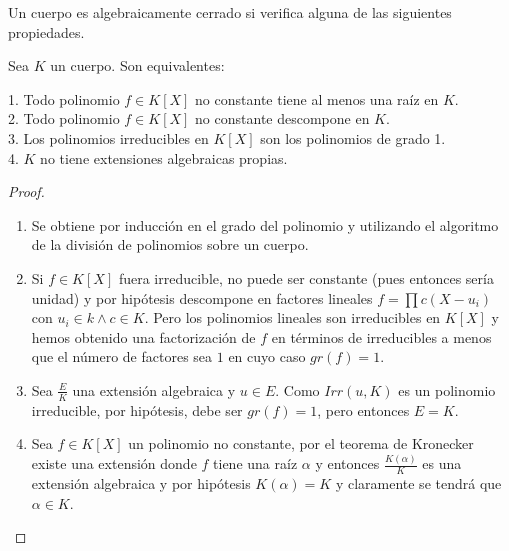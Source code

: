 \begin{definition}
Un cuerpo es algebraicamente cerrado si verifica alguna de las siguientes propiedades.
\end{definition}

\begin{proposition}
	Sea $K$ un cuerpo. Son equivalentes:
	
	1. Todo polinomio $f \in K[X]$ no constante tiene al menos una raíz en $K$.\\
	2. Todo polinomio $f \in K[X]$ no constante descompone en $K$. \\
	3. Los polinomios irreducibles en $K[X]$ son los polinomios de grado 1. \\
	4. $K$ no tiene extensiones algebraicas propias. 
\end{proposition}
\begin{proof}
\begin{enumerate}
\item Se obtiene por inducción en el grado del polinomio y utilizando el algoritmo de la división de polinomios sobre un cuerpo.
\item Si $f \in K[X]$ fuera irreducible, no puede ser constante (pues entonces sería unidad) y por hipótesis descompone en factores lineales $f = \prod c(X-u_i)$ con $u_i \in k \land c \in K$. Pero los polinomios lineales son irreducibles en $K[X]$ y hemos obtenido una factorización de $f$ en términos de irreducibles a menos que el número de factores sea $1$ en cuyo caso $gr(f) = 1$. 
\item Sea $\frac{E}{K}$ una extensión algebraica y $u \in E$. Como $Irr(u,K)$ es un polinomio irreducible, por hipótesis, debe ser $gr(f) = 1$, pero entonces $E = K$.
 
\item Sea $f \in K[X]$ un polinomio no constante, por el teorema de Kronecker existe una extensión donde $f$ tiene una raíz $\alpha$ y entonces $\frac{K(\alpha)}{K}$ es una extensión algebraica y por hipótesis $K(\alpha) = K$ y claramente se tendrá que $\alpha \in K$. 
\end{enumerate}
\end{proof}

